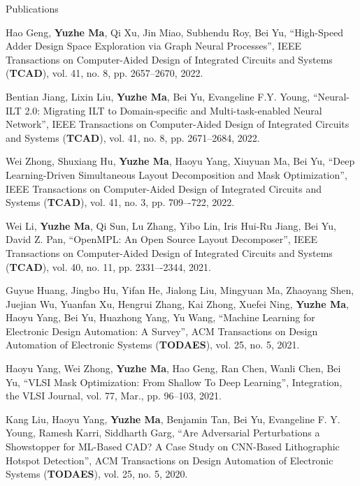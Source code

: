 \begin{rSection}{Publications}
\begin{etaremune}
\item {
    Hao Geng, \textbf{Yuzhe Ma}, Qi Xu, Jin Miao, Subhendu Roy, Bei Yu,
    ``High-Speed Adder Design Space Exploration via Graph Neural Processes'',
    IEEE Transactions on Computer-Aided Design of Integrated Circuits and Systems (\textbf{TCAD}), vol. 41, no. 8, pp. 2657--2670, 2022.
}


\item {
    Bentian Jiang, Lixin Liu, \textbf{Yuzhe Ma}, Bei Yu, Evangeline F.Y. Young,
    ``Neural-ILT 2.0: Migrating ILT to Domain-specific and Multi-task-enabled Neural Network'',
    IEEE Transactions on Computer-Aided Design of Integrated Circuits and Systems (\textbf{TCAD}), vol. 41, no. 8, pp. 2671--2684, 2022.
}

\item {
    Wei Zhong, Shuxiang Hu, \textbf{Yuzhe Ma}, Haoyu Yang, Xiuyuan Ma, Bei Yu,
    ``Deep Learning-Driven Simultaneous Layout Decomposition and Mask Optimization'',
    IEEE Transactions on Computer-Aided Design of Integrated Circuits and Systems (\textbf{TCAD}),  vol. 41, no. 3, pp. 709–-722, 2022. 
}

\item{
    Wei Li, \textbf{Yuzhe Ma}, Qi Sun, Lu Zhang, Yibo Lin, Iris Hui-Ru Jiang, Bei Yu, David Z. Pan,
    ``OpenMPL: An Open Source Layout Decomposer'',
    IEEE Transactions on Computer-Aided Design of Integrated Circuits and Systems (\textbf{TCAD}), vol. 40, no. 11, pp. 2331–-2344, 2021.
}

\item {
        Guyue Huang, Jingbo Hu, Yifan He, Jialong Liu, Mingyuan Ma, Zhaoyang Shen, Juejian Wu, Yuanfan Xu, Hengrui Zhang, Kai Zhong, Xuefei Ning, \textbf{Yuzhe Ma}, Haoyu Yang, Bei Yu, Huazhong Yang, Yu Wang,
        ``Machine Learning for Electronic Design Automation: A Survey'',
        ACM Transactions on Design Automation of Electronic Systems (\textbf{TODAES}), vol. 25, no. 5, 2021.
}

\item{
        Haoyu Yang, Wei Zhong, \textbf{Yuzhe Ma}, Hao Geng, Ran Chen, Wanli Chen, Bei Yu,
        ``VLSI Mask Optimization: From Shallow To Deep Learning'',
        Integration, the VLSI Journal, vol. 77, Mar., pp. 96–103, 2021.
    }

\item{
        Kang Liu, Haoyu Yang, \textbf{Yuzhe Ma}, Benjamin Tan, Bei Yu, Evangeline F. Y. Young, Ramesh Karri, Siddharth Garg,
        ``Are Adversarial Perturbations a Showstopper for ML-Based CAD? A Case Study on CNN-Based Lithographic Hotspot Detection'',
        ACM Transactions on Design Automation of Electronic Systems (\textbf{TODAES}), vol. 25, no. 5, 2020.
}



\end{etaremune}
\end{rSection}
